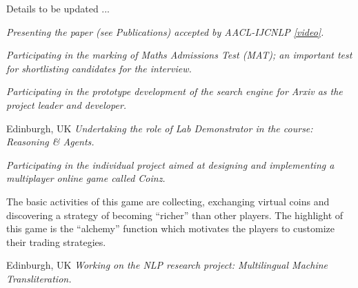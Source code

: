 \documentclass[%
               doublesided,
               paper=a4,
               fontsize=11pt
              ]{my-resume}
\begin{document}
{\small Details to be updated ...\\}

\divider 

\textit{\small Presenting the paper (see Publications) accepted by AACL-IJCNLP \href{https://www.youtube.com/watch?v=VzcCkX_MjWU&t=15s}{[video]}.}

\divider 

\textit{\small Participating in the marking of Maths Admissions Test (MAT); an important test for shortlisting candidates for the interview.}

\divider 

\textit{\small Participating in the prototype development of the search engine for Arxiv as the project leader and developer.}


\divider

  {Edinburgh, UK}
\textit{\small Undertaking the role of Lab Demonstrator in the course: Reasoning \& Agents.}

\divider

\textit{\small Participating in the individual project aimed at designing and implementing a multiplayer online game called Coinz.}   

{\small The  basic  activities  of  this  game  are  collecting,  exchanging  virtual  coins  and  discovering  a strategy of becoming ``richer'' than other players. The highlight of this game is the ``alchemy'' function which motivates the players to customize their trading strategies.}

\divider

     {Edinburgh, UK}
\textit{\small Working on the NLP research project: Multilingual Machine Transliteration.}
\end{document}
